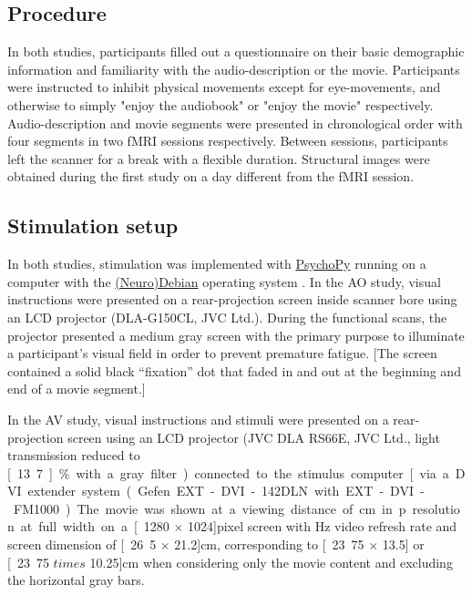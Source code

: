 \documentclass[english]{article}
\begin{document}
\subsection{Procedure}
In both studies, participants filled out a questionnaire on their basic demographic information and familiarity with the audio-description or the movie.
Participants were instructed to inhibit physical movements except for eye-movements, and otherwise to simply "enjoy the audiobook" or "enjoy the movie" respectively.
Audio-description and movie segments were presented in chronological order with four segments in two fMRI sessions respectively.
Between sessions, participants left the scanner for a break with a flexible duration. Structural images were obtained during the first study on a day different from the fMRI session.


\subsection{Stimulation setup}
In both studies, stimulation was implemented with \href{http://www.psychopy.org}{PsychoPy} \citep{peirce2007psychopy} running on a computer with the \href{http://neuro.debian.net}{(Neuro)Debian} operating system \citep{halchenko2012open}.
In the AO study, visual instructions were presented on a rear-projection screen inside scanner bore using an LCD projector (DLA-G150CL, JVC Ltd.).
During the functional scans, the projector presented a medium gray screen with the primary purpose to illuminate a participant's visual field in order to prevent premature fatigue.
[The screen contained a solid black ``fixation'' dot that faded in and out at the beginning and end of a movie segment.]

In the AV study, visual instructions and stimuli were presented on a rear-projection screen using an LCD projector (JVC DLA RS66E, JVC Ltd., light transmission reduced to \unit[13.7]{\%} with a gray filter) connected to the stimulus computer [via a DVI extender system (Gefen EXT-DVI-142DLN with EXT-DVI-FM1000).
The movie was shown at a viewing distance of \unit[63]{cm} in \unit[720]{p} resolution at full width on a \unit[1280 $\times$ 1024]{pixel} screen with \unit[60]{Hz} video refresh rate and screen dimension of \unit[26.5 $\times$ 21.2]{cm}, corresponding to \unit[23.75 $\times$ 13.5] or \unit[23.75 $times$ 10.25]{cm} when considering only the movie content and excluding the horizontal gray bars.
\end{document}
